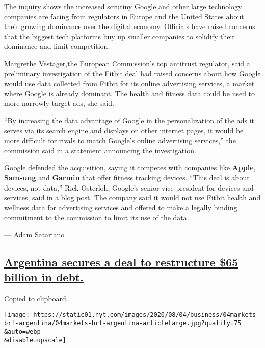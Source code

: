 The inquiry shows the increased scrutiny Google and other large
technology companies are facing from regulators in Europe and the United
States about their growing dominance over the digital economy. Officials
have raised concerns that the biggest tech platforms buy up smaller
companies to solidify their dominance and limit competition.

\href{https://ec.europa.eu/commission/presscorner/detail/en/ip_20_1446}{Margrethe
Vestager,}the European Commission's top antitrust regulator, said a
preliminary investigation of the Fitbit deal had raised concerns about
how Google would use data collected from Fitbit for its online
advertising services, a market where Google is already dominant. The
health and fitness data could be used to more narrowly target ads, she
said.

``By increasing the data advantage of Google in the personalization of
the ads it serves via its search engine and displays on other internet
pages, it would be more difficult for rivals to match Google's online
advertising services,'' the commission said in a statement announcing
the investigation.

Google defended the acquisition, saying it competes with companies like
\textbf{Apple}, \textbf{Samsung} and \textbf{Garmin} that offer fitness
tracking devices. ``This deal is about devices, not data,'' Rick
Osterloh, Google's senior vice president for devices and services,
\href{https://blog.google/around-the-globe/google-europe/update-fitbit/}{said
in a blog post}. The company said it would not use Fitbit health and
wellness data for advertising services and offered to make a legally
binding commitment to the commission to limit its use of the data.

--- \href{https://www.nytimes.com/by/adam-satariano}{Adam Satariano}

\hypertarget{argentina-secures-a-deal-to-restructure-65-billion-in-debt}{%
\subsection{\texorpdfstring{\protect\hyperlink{argentina-secures-a-deal-to-restructure-65-billion-in-debt}{Argentina
secures a deal to restructure \$65 billion in
debt.}}{Argentina secures a deal to restructure \$65 billion in debt.}}\label{argentina-secures-a-deal-to-restructure-65-billion-in-debt}}

Copied to clipboard.

\texttt{[image: https://static01.nyt.com/images/2020/08/04/business/04markets-brf-argentina/04markets-brf-argentina-articleLarge.jpg?quality=75\\\&auto=webp\\\&disable=upscale]}

